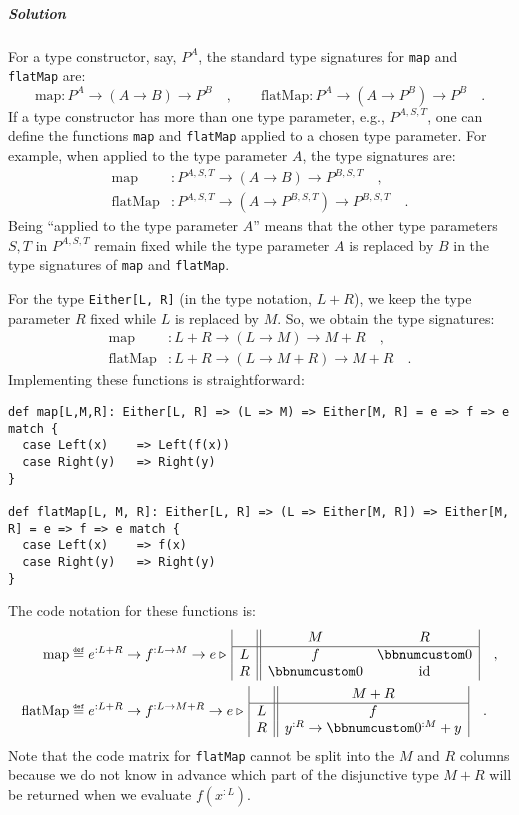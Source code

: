 \subparagraph{Solution}

For a type constructor, say, $P^{A}$, the standard type signatures
for \lstinline!map! and \lstinline!flatMap! are:
\[
\text{map}:P^{A}\rightarrow(A\rightarrow B)\rightarrow P^{B}\quad,\quad\quad\text{flatMap}:P^{A}\rightarrow(A\rightarrow P^{B})\rightarrow P^{B}\quad.
\]
If a type constructor has more than one type parameter, e.g., $P^{A,S,T}$,
one can define the functions \lstinline!map! and \lstinline!flatMap!
applied to a chosen type parameter. For example, when applied to the
type parameter $A$, the type signatures are:
\begin{align*}
\text{map} & :P^{A,S,T}\rightarrow(A\rightarrow B)\rightarrow P^{B,S,T}\quad,\\
\text{flatMap} & :P^{A,S,T}\rightarrow(A\rightarrow P^{B,S,T})\rightarrow P^{B,S,T}\quad.
\end{align*}
Being \textsf{``}applied to the type parameter $A$\textsf{''} means that the other
type parameters $S,T$ in $P^{A,S,T}$ remain fixed while the type
parameter $A$ is replaced by $B$ in the type signatures of \lstinline!map!
and \lstinline!flatMap!.

For the type \lstinline!Either[L, R]! (in the type notation, $L+R$),
we keep the type parameter $R$ fixed while $L$ is replaced by $M$.
So, we obtain the type signatures:
\begin{align*}
\text{map} & :L+R\rightarrow(L\rightarrow M)\rightarrow M+R\quad,\\
\text{flatMap} & :L+R\rightarrow(L\rightarrow M+R)\rightarrow M+R\quad.
\end{align*}
Implementing these functions is straightforward:
\begin{lstlisting}
def map[L,M,R]: Either[L, R] => (L => M) => Either[M, R] = e => f => e match {
  case Left(x)    => Left(f(x))
  case Right(y)   => Right(y)
}

def flatMap[L, M, R]: Either[L, R] => (L => Either[M, R]) => Either[M, R] = e => f => e match {
  case Left(x)    => f(x)
  case Right(y)   => Right(y)
}
\end{lstlisting}
The code notation for these functions is:
\begin{align*}
\text{map} & \triangleq e^{:L+R}\rightarrow f^{:L\rightarrow M}\rightarrow e\triangleright\,\begin{array}{|c||cc|}
 & M & R\\
\hline L & f & \bbnum 0\\
R & \bbnum 0 & \text{id}
\end{array}\quad,\\
\text{flatMap} & \triangleq e^{:L+R}\rightarrow f^{:L\rightarrow M+R}\rightarrow e\triangleright\,\begin{array}{|c||c|}
 & M+R\\
\hline L & f\\
R & y^{:R}\rightarrow\bbnum 0^{:M}+y
\end{array}\quad.
\end{align*}
Note that the code matrix for \lstinline!flatMap! cannot be split
into the $M$ and $R$ columns because we do not know in advance which
part of the disjunctive type $M+R$ will be returned when we evaluate
$f(x^{:L})$.

